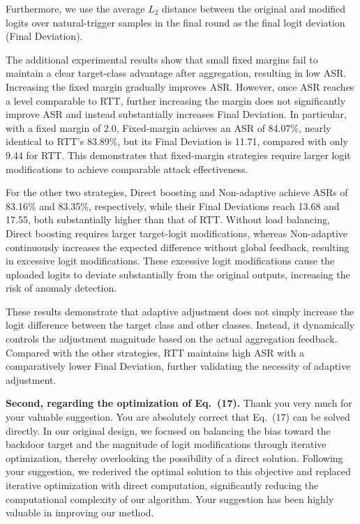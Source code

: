 \documentclass[11pt,a4paper]{article}
\newcommand{\manualindent}{\par\noindent\hspace*{1.5em}\ignorespaces}
\begin{document}
{\manualindent Furthermore, we use the average $L_2$ distance between the original and modified logits over natural-trigger samples in the final round as the final logit deviation (Final Deviation).

\manualindent The additional experimental results show that small fixed margins fail to maintain a clear target-class advantage after aggregation, resulting in low ASR.
Increasing the fixed margin gradually improves ASR.
However, once ASR reaches a level comparable to RTT, further increasing the margin does not significantly improve ASR and instead substantially increases Final Deviation.
In particular, with a fixed margin of 2.0, Fixed-margin achieves an ASR of 84.07\%, nearly identical to RTT's 83.89\%, but its Final Deviation is 11.71, compared with only 9.44 for RTT.
This demonstrates that fixed-margin strategies require larger logit modifications to achieve comparable attack effectiveness.

\manualindent For the other two strategies, Direct boosting and Non-adaptive achieve ASRs of 83.16\% and 83.35\%, respectively, while their Final Deviations reach 13.68 and 17.55, both substantially higher than that of RTT.
Without load balancing, Direct boosting requires larger target-logit modifications, whereas Non-adaptive continuously increases the expected difference without global feedback, resulting in excessive logit modifications.
These excessive logit modifications cause the uploaded logits to deviate substantially from the original outputs, increasing the risk of anomaly detection.

\manualindent These results demonstrate that adaptive adjustment does not simply increase the logit difference between the target class and other classes.
Instead, it dynamically controls the adjustment magnitude based on the actual aggregation feedback.
Compared with the other strategies, RTT maintains high ASR with a comparatively lower Final Deviation, further validating the necessity of adaptive adjustment.

\manualindent \textbf{Second, regarding the optimization of Eq.~(17).}
Thank you very much for your valuable suggestion.
You are absolutely correct that Eq.~(17) can be solved directly.
In our original design, we focused on balancing the bias toward the backdoor target and the magnitude of logit modifications through iterative optimization, thereby overlooking the possibility of a direct solution.
Following your suggestion, we rederived the optimal solution to this objective and replaced iterative optimization with direct computation, significantly reducing the computational complexity of our algorithm.
Your suggestion has been highly valuable in improving our method.

}
\end{document}
